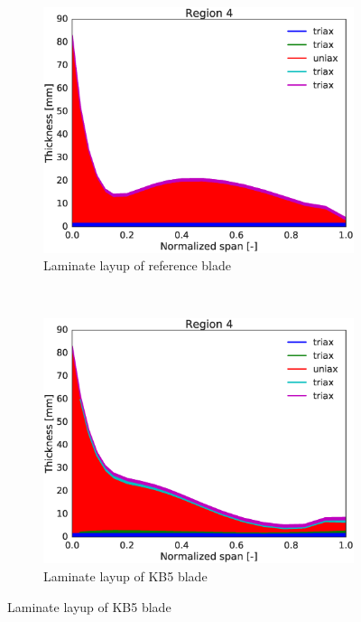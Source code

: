 \begin{figure}[tph]
\begin{subfigure}{0.50\textwidth}
\includegraphics[width=\linewidth]{figures/KB6_final/baseline_laminate_layers_r04.eps}
\caption{Laminate layup of reference blade}
\label{subfig:baseline_layers_r04}
\end{subfigure}
 ~
\begin{subfigure}{0.50\textwidth}
\includegraphics[width=\linewidth]{figures/KB6_final/KB5_laminate_layers_r04.eps}
\caption{Laminate layup of KB5 blade}
\label{subfig:KB5_layers_r04}
\end{subfigure}


\end{figure}
